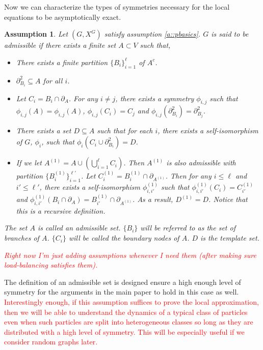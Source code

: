 \documentclass[12pt]{article}
\newcommand{\tr}{\textcolor{red}}
\newcommand{\ind}{\hspace{24pt}}
\newcommand{\neigh}[1]{\partial_{#1}}				%
\newcommand{\dneigh}[1]{\partial^2_{#1}}			%
\newcommand{\Xf}{X}									%
\newcommand{\gind}[1]{^{#1}}						%
\newtheorem{assu}[thms]{Assumption}
\begin{document}
Now we can characterize the types of symmetries necessary for the local equations to be asymptotically exact.

\begin{assu}
Let \((G,\Xf\gind{G})\) satisfy assumption \ref{a::pbasics}. \(G\) is said to be admissible if there exists a finite set \(A \subset V\) such that,

\begin{itemize}
\item There exists a finite partition \(\{B_i\}_{i=1}^\ell\) of \(A^c\).

\item \(\dneigh{B_i} \subseteq A\) for all \(i\).

\item Let \(C_i = B_i\cap \neigh{A}\). For any \(i \neq j\), there exists a symmetry \(\phi_{i,j}\) such that \(\phi_{i,j}(A) = \phi_{i,j}(A)\), \(\phi_{i,j}(C_i) = C_j\) and \(\phi_{i,j}(\dneigh{B_i}) = \dneigh{B_j}\).

\item There exists a set \(D \subseteq A\) such that for each \(i\), there exists a self-isomorphism of \(G\), \(\phi_i\), such that \(\phi_i(C_i\cup \dneigh{B_i}) = D\).

\item If we let \(A^{(1)} = A\cup \left(\bigcup_{i=1}^\ell C_i\right)\). Then \(A^{(1)}\) is also admissible with partition \(\{B^{(1)}_i\}_{i=1}^{\ell'}\). Let \(C^{(1)}_i = B^{(1)}_i\cap \neigh{A^{(1)}}\). Then for any \(i \leq \ell\) and \(i' \leq \ell'\), there exists a self-isomorphism \(\phi^{(1)}_{i,i'}\) such that \(\phi^{(1)}_{i,i'}(C_i) = C^{(1)}_{i'}\) and \(\phi^{(1)}_{i,i'}(B_i\cap\neigh{A}) = B^{(1)}_{i'}\cap \neigh{A^{(1)}}\). As a result, \(D^{(1)} = D\). Notice that this is a recursive definition.
\end{itemize}

The set \(A\) is called an admissible set. \(\{B_i\}\) will be referred to as the set of branches of \(A\). \(\{C_i\}\) will be called the boundary nodes of \(A\). \(D\) is the template set.

\ind \tr{Right now I'm just adding assumptions whenever I need them (after making sure load-balancing satisfies them).}
\label{a::admissible}
\end{assu}

The definition of an admissible set is designed ensure a high enough level of symmetry for the arguments in the main paper to hold in this case as well. \tr{Interestingly enough, if this assumption suffices to prove the local approximation, then we will be able to understand the dynamics of a typical class of particles even when such particles are split into heterogeneous classes so long as they are distributed with a high level of symmetry. This will be especially useful if we consider random graphs later.}
\end{document}
